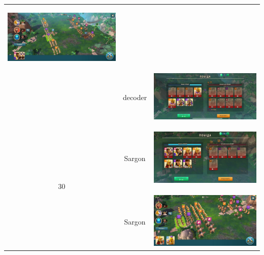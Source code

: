\begin{longtable}{|c|c|c|}
	\hypertarget{fight29}{\includegraphics[width=0.75\linewidth]{./parts/media/TreasureHunt/29/decoder/photo_2022-04-07_09-59-10.jpg}} \\
	& decoder &
	\includegraphics[width=0.75\linewidth]{./parts/media/TreasureHunt/29/decoder/photo_2022-04-07_09-59-23.jpg} \\
	\hline
	\multirow{15}{*}{30} & Sargon &
	\hypertarget{fight30}{\includegraphics[width=0.75\linewidth]{./parts/media/TreasureHunt/30/sargon/photo_2022-04-07_10-05-04.jpg}} \\
	& Sargon &
	\includegraphics[width=0.75\linewidth]{./parts/media/TreasureHunt/30/sargon/photo_2022-04-07_10-04-47.jpg} \\

\end{longtable}
